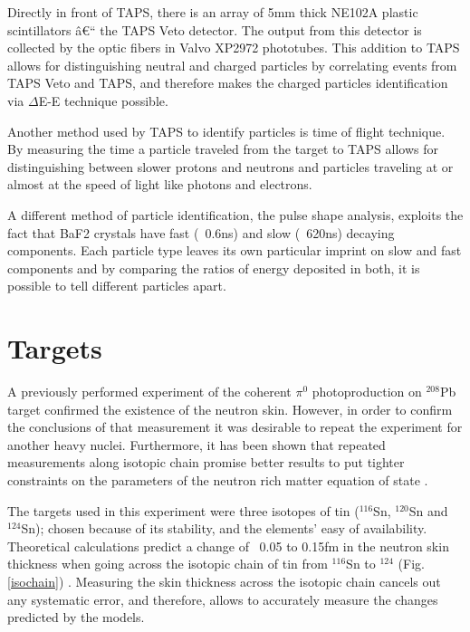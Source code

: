 \indent Directly  in  front  of  TAPS,  there  is  an  array  of  5mm  thick  NE102A  plastic scintillators â€“ the TAPS Veto detector. The output from this detector is collected by the optic fibers in Valvo XP2972 phototubes. This addition to TAPS allows for distinguishing neutral and charged particles by correlating events from TAPS Veto and TAPS, and therefore makes the charged particles identification via $\Delta$E-E technique possible.

\indent Another method used by TAPS to identify particles is time of flight technique. By measuring  the  time  a  particle  traveled  from  the  target  to  TAPS  allows  for distinguishing between slower protons and neutrons and particles traveling at or almost at the speed of light like photons and electrons.

\indent A different method of particle identification, the pulse shape analysis, exploits the fact  that  BaF2  crystals  have  fast  (~0.6ns)  and  slow  (~620ns)  decaying components. Each particle type leaves its own particular imprint on slow and fast components and by comparing the ratios of energy deposited in both, it is possible to tell different particles apart.

\section{Targets}

\indent A previously performed experiment of the coherent $\pi^{0}$ photoproduction on $^{208}$Pb target confirmed the existence of the neutron skin. However, in order to confirm the conclusions of that measurement it was desirable to repeat the experiment for  another  heavy  nuclei.  Furthermore,  it  has  been shown  that  repeated measurements  along  isotopic  chain  promise  better  results  to  put  tighter constraints on the parameters of the neutron rich matter equation of state \cite{centelles}.

\indent The targets used in this experiment were three isotopes of tin ($^{116}$Sn, $^{120}$Sn and $^{124}$Sn); chosen because of its stability, and the elements' easy of availability. Theoretical  calculations  predict  a change of  ~0.05  to  0.15fm  in  the neutron  skin thickness when going across the isotopic chain of tin from $^{116}$Sn to $^{124}$ (Fig. \ref{isochain}) \cite{liewen}. Measuring the skin thickness across the  isotopic  chain  cancels  out  any systematic error,  and  therefore,  allows  to accurately measure the changes predicted by the models.


